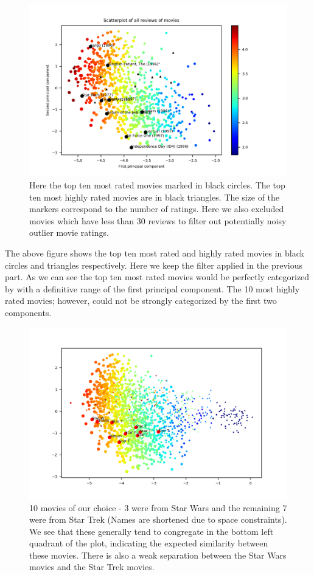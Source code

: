 \begin{figure}[H]
	\centering
	\includegraphics[width=1.0\textwidth]{Scores30Labelled.png}
	\caption{Here the top ten most rated movies marked in black circles. The top ten most highly rated movies are in black triangles. The size of the markers correspond to the number of ratings. Here we also excluded movies which have less than 30 reviews to filter out potentially noisy outlier movie ratings.}
\end{figure}

The above figure shows the top ten most rated and highly rated movies in black circles and triangles respectively. Here we keep the filter applied in the previous part. As we can see the top ten most rated movies would be perfectly categorized by with a definitive range of the first principal component. The 10 most highly rated movies; however, could not be strongly categorized by the first two components.

\begin{figure}[H]
	\centering
	\includegraphics[width=1.0\textwidth]{Star.png}
	\caption{10 movies of our choice - 3 were from Star Wars and the remaining 7 were from Star Trek (Names are shortened due to space constraints). We see that these generally tend to congregate in the bottom left quadrant of the plot, indicating the expected similarity between these movies. There is also a weak separation between the Star Wars movies and the Star Trek movies.}
\end{figure}

